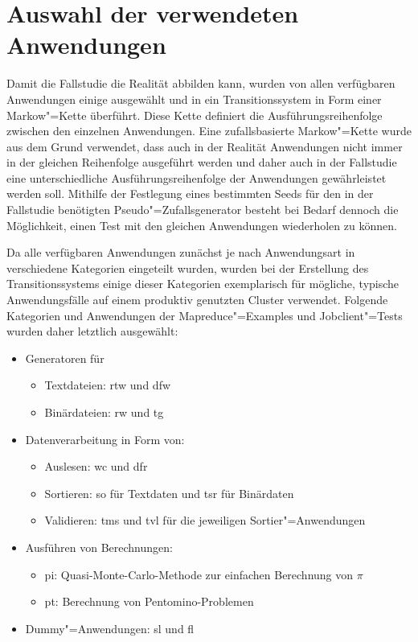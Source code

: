\section{Auswahl der verwendeten Anwendungen}\label{sec:appSelection}

Damit die Fallstudie die Realität abbilden kann, wurden von allen verfügbaren Anwendungen einige ausgewählt und in ein Transitionssystem in Form einer Markow"=Kette überführt.
Diese Kette definiert die Ausführungsreihenfolge zwischen den einzelnen Anwendungen.
Eine zufallsbasierte Markow"=Kette wurde aus dem Grund verwendet, dass auch in der Realität Anwendungen nicht immer in der gleichen Reihenfolge ausgeführt werden und daher auch in der Fallstudie eine unterschiedliche Ausführungsreihenfolge der Anwendungen gewährleistet werden soll.
Mithilfe der Festlegung eines bestimmten Seeds für den in der Fallstudie benötigten Pseudo"=Zufallsgenerator besteht bei Bedarf dennoch die Möglichkeit, einen Test mit den gleichen Anwendungen wiederholen zu können.

Da alle verfügbaren Anwendungen zunächst je nach Anwendungsart in verschiedene Kategorien eingeteilt wurden, wurden bei der Erstellung des Transitionssystems einige dieser Kategorien exemplarisch für mögliche, typische Anwendungsfälle auf einem produktiv genutzten Cluster verwendet.
Folgende Kategorien und Anwendungen der Mapreduce"=Examples und Jobclient"=Tests wurden daher letztlich ausgewählt:

\begin{itemize}
    \item Generatoren für
    \begin{itemize}
        \item Textdateien: \ac{rtw} und \ac{dfw}
        \item Binärdateien: \ac{rw} und \ac{tg}
    \end{itemize}

    \item Datenverarbeitung in Form von:
    \begin{itemize}
        \item Auslesen: \ac{wc} und \ac{dfr}
        \item Sortieren: \ac{so} für Textdaten und \ac{tsr} für Binärdaten
        \item Validieren: \ac{tms} und \ac{tvl} für die jeweiligen Sortier"=Anwendungen
    \end{itemize}

    \item Ausführen von Berechnungen:
    \begin{itemize}
        \item \acl{pi}: Quasi-Monte-Carlo-Methode zur einfachen Berechnung von $\pi$ 
        \item \ac{pt}: Berechnung von Pentomino-Problemen
    \end{itemize}

    \item Dummy"=Anwendungen: \ac{sl} und \ac{fl}
\end{itemize}

